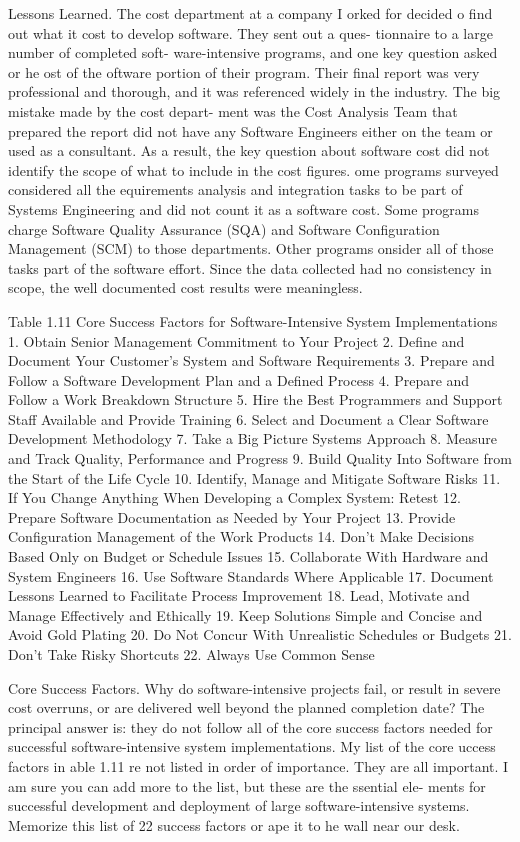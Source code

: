 \documentclass{book}
\begin{document}
\begin{multicols}{2}
Lessons Learned. The cost department at a
company I orked for decided o find out what
it cost to develop software. They sent out a ques-
tionnaire to a large number of completed soft-
ware-intensive programs, and one key question
asked or he ost of the oftware portion of their
program. Their final report was very professional
and thorough, and it was referenced widely in
the industry.
The big mistake made by the cost depart-
ment was the Cost Analysis Team that prepared
the report did not have any Software Engineers
either on the team or used as a consultant. As a
result, the key question about software cost did
not identify the scope of what to include in the
cost figures. ome programs surveyed considered
all the equirements analysis and integration
tasks to be part of Systems Engineering and did
not count it as a software cost. Some programs
charge Software Quality Assurance (SQA) and
Software Configuration Management (SCM) to
those departments. Other programs onsider all
of those tasks part of the software effort. Since the
data collected had no consistency in scope, the
well documented cost results were meaningless.


Table 1.11 Core Success Factors for Software-Intensive
System Implementations
1. Obtain Senior Management Commitment to Your
Project
2. Define and Document Your Customer’s System and
Software Requirements
3. Prepare and Follow a Software Development Plan and
a Defined Process
4. Prepare and Follow a Work Breakdown Structure
5. Hire the Best Programmers and Support Staff
Available and Provide Training
6. Select and Document a Clear Software Development
Methodology
7. Take a Big Picture Systems Approach
8. Measure and Track Quality, Performance and Progress
9. Build Quality Into Software from the Start of the Life
Cycle
10. Identify, Manage and Mitigate Software Risks
11. If You Change Anything When Developing a Complex
System: Retest
12. Prepare Software Documentation as Needed by Your
Project
13. Provide Configuration Management of the Work
Products
14. Don’t Make Decisions Based Only on Budget or
Schedule Issues
15. Collaborate With Hardware and System Engineers
16. Use Software Standards Where Applicable
17. Document Lessons Learned to Facilitate Process
Improvement
18. Lead, Motivate and Manage Effectively and Ethically
19. Keep Solutions Simple and Concise and Avoid Gold
Plating
20. Do Not Concur With Unrealistic Schedules or
Budgets
21. Don’t Take Risky Shortcuts
22. Always Use Common Sense

Core Success Factors. Why do software-intensive projects
fail, or result in severe cost overruns, or are delivered well
beyond the planned completion date? The principal answer
is: they do not follow all of the core success factors needed for
successful software-intensive system implementations. My
list of the core uccess factors in able 1.11 re not listed
in order of importance. They are all important. I am sure
you can add more to the list, but these are the ssential ele-
ments for successful development and deployment of large
software-intensive systems. Memorize this list of 22 success
factors or ape it to he wall near our desk.
 
\end{multicols}
\end{document}
